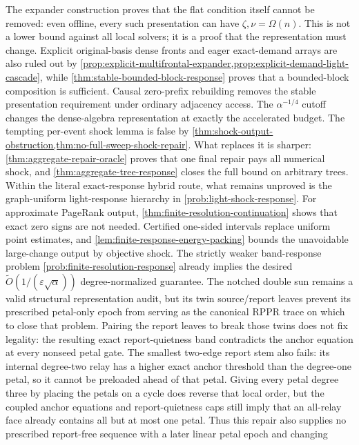 The expander construction proves that the flat condition itself cannot be
removed: even offline, every such presentation can have
$\zeta,\nu=\Omega(n)$.  This is not a lower bound against all local solvers;
it is a proof that the representation must change.  Explicit original-basis
dense fronts and eager exact-demand arrays are also ruled out by
\cref{prop:explicit-multifrontal-expander,prop:explicit-demand-light-cascade},
while \cref{thm:stable-bounded-block-response} proves that a bounded-block
composition is sufficient.  Causal zero-prefix rebuilding removes the stable
presentation requirement under ordinary adjacency access.  The
$\alpha^{-1/4}$ cutoff changes the dense-algebra representation at exactly
the accelerated budget.  The tempting per-event shock lemma is false by
\cref{thm:shock-output-obstruction,thm:no-full-sweep-shock-repair}.  What
replaces it is sharper: \cref{thm:aggregate-repair-oracle} proves that one
final repair pays all numerical shock, and
\cref{thm:aggregate-tree-response} closes the full bound on arbitrary trees.
Within the literal exact-response hybrid route, what remains unproved is the
graph-uniform light-response hierarchy in
\cref{prob:light-shock-response}.  For approximate PageRank output,
\cref{thm:finite-resolution-continuation} shows that exact zero signs are not
needed.  Certified one-sided intervals replace uniform point estimates, and
\cref{lem:finite-response-energy-packing} bounds the unavoidable large-change
output by objective shock.  The strictly weaker band-response problem
\cref{prob:finite-resolution-response} already implies the desired
$\widetilde O(1/(\varepsilon\sqrt\alpha))$ degree-normalized guarantee.  The
notched double sun remains a valid structural representation audit, but its
twin source/report leaves prevent its prescribed petal-only epoch from serving
as the canonical RPPR trace on which to close that problem.  Pairing the
report leaves to break those twins does not fix legality: the resulting exact
report-quietness band contradicts the anchor equation at every nonseed petal
gate.  The smallest two-edge report stem also fails: its internal degree-two
relay has a higher exact anchor threshold than the degree-one petal, so it
cannot be preloaded ahead of that petal.  Giving every petal degree three by
placing the petals on a cycle does reverse that local order, but the coupled
anchor equations and report-quietness caps still imply that an all-relay face
already contains all but at most one petal.  Thus this repair also supplies no
prescribed report-free sequence with a later linear petal epoch and changing
